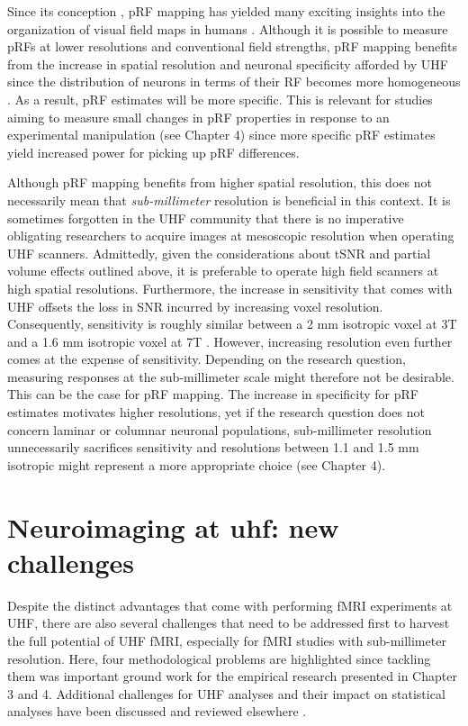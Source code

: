 Since its conception \parencite{Dumoulin2008}, pRF mapping has yielded many exciting insights into the organization of visual field maps in humans \parencite{Amano2009, Winawer2010, Harvey2011, Zuiderbaan2012, Kay2013, Klein2014, Kay2015, Harvey2015, Fracasso2016}. Although it is possible to measure pRFs at lower resolutions and conventional field strengths, pRF mapping benefits from the increase in spatial resolution and neuronal specificity afforded by UHF since the distribution of neurons in terms of their RF becomes more homogeneous \parencite{DeMartino2016}. As a result, pRF estimates will be more specific. This is relevant for studies aiming to measure small changes in pRF properties in response to an experimental manipulation (see Chapter 4) since more specific pRF estimates yield increased power for picking up pRF differences.

Although pRF mapping benefits from higher spatial resolution, this does not necessarily mean that \textit{sub-millimeter} resolution is beneficial in this context. It is sometimes forgotten in the UHF community that there is no imperative obligating researchers to acquire images at mesoscopic resolution when operating UHF scanners. Admittedly, given the considerations about tSNR and partial volume effects outlined above, it is preferable to operate high field scanners at high spatial resolutions. Furthermore, the increase in sensitivity that comes with UHF offsets the loss in SNR incurred by increasing voxel resolution. Consequently, sensitivity is roughly similar between a 2 mm isotropic voxel at 3T and a 1.6 mm isotropic voxel at 7T \parencite{DeMartino2016}. However, increasing resolution even further comes at the expense of sensitivity. Depending on the research question, measuring responses at the sub-millimeter scale might therefore not be desirable. This can be the case for pRF mapping. The increase in specificity for pRF estimates motivates higher resolutions, yet if the research question does not concern laminar or columnar neuronal populations, sub-millimeter resolution unnecessarily sacrifices sensitivity and resolutions between 1.1 and 1.5 mm isotropic might represent a more appropriate choice (see Chapter 4).

\section{Neuroimaging at uhf: new challenges}
Despite the distinct advantages that come with performing fMRI experiments at UHF, there are also several challenges that need to be addressed first to harvest the full potential of UHF fMRI, especially for fMRI studies with sub-millimeter resolution. Here, four methodological problems are highlighted since tackling them was important ground work for the empirical research presented in Chapter 3 and 4. Additional challenges for UHF analyses and their impact on statistical analyses have been discussed and reviewed elsewhere \parencite{Polimeni2017, DeMartino2016}.

